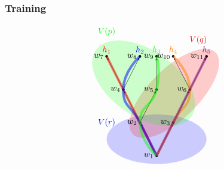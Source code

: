 \documentclass[xcolor=x11names]{beamer}
\newcommand{\bemph}[1] {{\color{DeepSkyBlue3}{#1}}}
\newcommand{\FD}{\mathbf F}
\newcommand{\Pmodels}{\mathrel{\models \hspace{-1.8ex} \raisebox{1.1ex}{\scalebox{.5}{$\mathrm{\bemph{P}}$}} }\,}
\begin{document}
\begin{frame}
	\frametitle{Training}
\footnotesize
\[\begin{tikzpicture}[world/.style={inner sep=.4mm, fill=black, circle},>=stealth, scale=.7]

\begin{scope}[opacity=.2]
\fill[blue]  (0,-1) ellipse (3 and 1.5);
\fill[red,rotate=45]  (2,0.5) ellipse (3.5 and 1.5);
\fill[green, rotate=-35]  (-2,1.5) ellipse (3.5 and 2);
\end{scope}
\node[world] (v1) at (0,-2) {};
\node[world] (v2) at (-1,0) {};
\node[world] (v3) at (1,0) {};
\node[world] (v4) at (-2,2) {};
\node[world] (v5) at (0,2) {};
\node[world] (v6) at (-3,4) {};
\node[world] (v9) at (2,2) {};
\node[world] (v10) at (1,4) {};
\node[world] (v11) at (3,4) {};
\node[world] (v8) at (0,4) {};
\node[world] (v7) at (-1,4) {};
\draw[->]  (v1) edge (v2);
\draw[->]  (v1) edge (v3);
\draw[->]  (v2) edge (v4);
\draw[->]  (v2) edge (v5);
\draw[->]  (v4) edge (v6);
\draw[->]  (v4) edge (v7);
\draw[->]  (v5) edge (v8);
\draw[->]  (v3) edge (v9);
\draw[->]  (v9) edge (v10);
\draw[->]  (v9) edge (v11);



\begin{scope}[line width=3, opacity=.5]
\draw[red]    plot[smooth, tension=1] coordinates {(v1) (v2) (v4) (v6)};
\draw[blue]   plot[smooth, tension=1] coordinates {(v1) (v2) (v4) (v7)};
\draw[green]  plot[smooth, tension=1] coordinates {(v1) (v2) (v5) (v8)};
\draw[orange] plot[smooth, tension=1] coordinates {(v1) (v3) (v9) (v10)};
\draw[violet] plot[smooth, tension=1] coordinates {(v1) (v3) (v9) (v11)};
\end{scope}
\begin{scope}[anchor=south]
\node[red] at (v6) {$h_1$};
\node[blue] at (v7) {$h_2$};
\node[green] at (v8) {$h_3$};
\node[orange] at (v10) {$h_4$};
\node[violet] at (v11) {$h_5$};
\end{scope}

\node[anchor=east] at (v4){$w_4$};
\node[anchor=east] at (v5){$w_5$};
\node[anchor=east] at (v9){$w_6$};
\node[anchor=east] at (v2){$w_2$};
\node[anchor=east] at (v3){$w_3$};
\node[anchor=east] at (v1){$w_1$};
\node[anchor=east] at (v6){$w_7$};
\node[anchor=east] at (v7){$w_8$};
\node[anchor=east] at (v8){$w_9$};
\node[anchor=east] at (v10){$w_{10}$};
\node[anchor=east] at (v11){$w_{11}$};

\node[green] at (-3,5.5) {$V(p)$};
\node[red] at (2.5,5) {$V(q)$};
\node[blue] at (-3,0) {$V(r)$};
\end{tikzpicture}\]

\end{frame}
\end{document}
